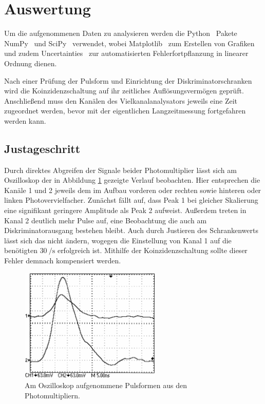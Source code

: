 \newpage
\section{Auswertung}

Um die aufgenommenen Daten zu analysieren werden die Python~\cite{python} Pakete NumPy~\cite{numpy} und SciPy~\cite{scipy} verwendet,
wobei Matplotlib~\cite{matplotlib} zum Erstellen von Grafiken und zudem Uncertainties~\cite{uncertainties} zur automatisierten
Fehlerfortpflanzung in linearer Ordnung dienen.

Nach einer Prüfung der Pulsform und Einrichtung der Diskriminatorschranken wird die Koinzidenzschaltung auf ihr zeitliches
Auflösungsvermögen geprüft. Anschließend muss den Kanälen des Vielkanalanalysators jeweils eine Zeit zugeordnet werden,
bevor mit der eigentlichen Langzeitmessung fortgefahren werden kann.



\subsection{Justageschritt}

Durch direktes Abgreifen der Signale beider Photomultiplier lässt sich am Oszilloskop der in Abbildung \ref{fig:pulse} gezeigte
Verlauf beobachten. Hier entsprechen die Kanäle 1 und 2 jeweils dem im Aufbau vorderen oder rechten sowie hinteren oder linken
Photovervielfacher. Zunächst fällt auf, dass Peak 1 bei gleicher Skalierung eine signifikant geringere Amplitude als Peak 2
aufweist. Außerdem treten in Kanal 2 deutlich mehr Pulse auf, eine Beobachtung die auch am Diskriminatorausgang bestehen bleibt.
Auch durch Justieren des Schrankenwerts lässt sich das nicht ändern, wogegen die Einstellung von Kanal 1 auf die benötigten
$\qty{30}{\per\second}$ erfolgreich ist. Mithilfe der Koinzidenzschaltung sollte dieser Fehler demnach kompensiert werden.

\begin{figure}[H]
	\vspace{\baselineskip}
	\centering
	\includegraphics[width=0.6\textwidth]{content/messung/pulse.jpg}
	\caption{Am Oszilloskop aufgenommene Pulsformen aus den Photomultipliern.}
	\label{fig:pulse}
\end{figure}

